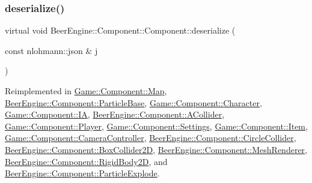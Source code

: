 \mbox{\label{class_beer_engine_1_1_component_1_1_component_a044d30f65879a1467f44aa3eb8ad7bce}} 
\subsubsection{\texorpdfstring{deserialize()}{deserialize()}}
{\footnotesize\ttfamily virtual void Beer\+Engine\+::\+Component\+::\+Component\+::deserialize (\begin{DoxyParamCaption}\item[{const nlohmann\+::json \&}]{j }\end{DoxyParamCaption})\hspace{0.3cm}{\ttfamily [virtual]}}



Reimplemented in \mbox{\hyperlink{class_game_1_1_component_1_1_map_a5f4f196675adfac9690cc2009734d516}{Game\+::\+Component\+::\+Map}}, \mbox{\hyperlink{class_beer_engine_1_1_component_1_1_particle_base_a227b7fe0edab6df4b6c15f4b22bed7ae}{Beer\+Engine\+::\+Component\+::\+Particle\+Base}}, \mbox{\hyperlink{class_game_1_1_component_1_1_character_adb7763de218329815eb32867c3e4c152}{Game\+::\+Component\+::\+Character}}, \mbox{\hyperlink{class_game_1_1_component_1_1_i_a_a81f34676232065d85961d84be1268e6f}{Game\+::\+Component\+::\+IA}}, \mbox{\hyperlink{class_beer_engine_1_1_component_1_1_a_collider_ac6bad21e0cfe7f95c431b9a7a59c550c}{Beer\+Engine\+::\+Component\+::\+A\+Collider}}, \mbox{\hyperlink{class_game_1_1_component_1_1_player_a448003673bc03c81447887b9a6d38084}{Game\+::\+Component\+::\+Player}}, \mbox{\hyperlink{class_game_1_1_component_1_1_settings_ae9edc71830f43d318f8dbcedce2d8bf9}{Game\+::\+Component\+::\+Settings}}, \mbox{\hyperlink{class_game_1_1_component_1_1_item_a3a9cb5ba936a644f23976d9c9e9bbdce}{Game\+::\+Component\+::\+Item}}, \mbox{\hyperlink{class_game_1_1_component_1_1_camera_controller_a8076e01593ef38a83c708854906abb3b}{Game\+::\+Component\+::\+Camera\+Controller}}, \mbox{\hyperlink{class_beer_engine_1_1_component_1_1_circle_collider_a25651d52d7b584deb7f82b09037124d5}{Beer\+Engine\+::\+Component\+::\+Circle\+Collider}}, \mbox{\hyperlink{class_beer_engine_1_1_component_1_1_box_collider2_d_ab7de4fc1ab97576308f9f5bb76098a54}{Beer\+Engine\+::\+Component\+::\+Box\+Collider2D}}, \mbox{\hyperlink{class_beer_engine_1_1_component_1_1_mesh_renderer_a19b2d1dd25274ea7af898af2bc305a7b}{Beer\+Engine\+::\+Component\+::\+Mesh\+Renderer}}, \mbox{\hyperlink{class_beer_engine_1_1_component_1_1_rigid_body2_d_ae070289cdf3c6fde105671d41ee8315a}{Beer\+Engine\+::\+Component\+::\+Rigid\+Body2D}}, and \mbox{\hyperlink{class_beer_engine_1_1_component_1_1_particle_explode_ad79e74129dd1cd7f20e0575a9ffdffc3}{Beer\+Engine\+::\+Component\+::\+Particle\+Explode}}.


